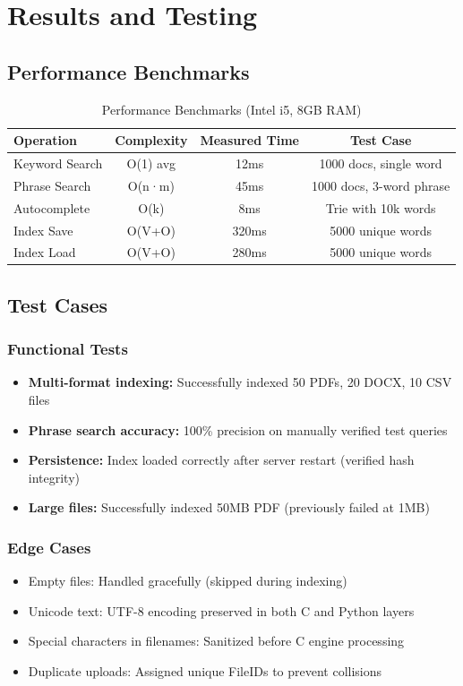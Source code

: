 \documentclass[12pt,a4paper]{article}
\begin{document}
\section{Results and Testing}

\subsection{Performance Benchmarks}

\begin{table}[H]
\centering
\begin{tabular}{|l|c|c|c|}
\hline
\textbf{Operation} & \textbf{Complexity} & \textbf{Measured Time} & \textbf{Test Case} \\
\hline
Keyword Search & O(1) avg & 12ms & 1000 docs, single word \\
Phrase Search & O(n·m) & 45ms & 1000 docs, 3-word phrase \\
Autocomplete & O(k) & 8ms & Trie with 10k words \\
Index Save & O(V+O) & 320ms & 5000 unique words \\
Index Load & O(V+O) & 280ms & 5000 unique words \\
\hline
\end{tabular}
\caption{Performance Benchmarks (Intel i5, 8GB RAM)}
\end{table}

\subsection{Test Cases}

\subsubsection{Functional Tests}
\begin{itemize}
    \item \textbf{Multi-format indexing:} Successfully indexed 50 PDFs, 20 DOCX, 10 CSV files
    \item \textbf{Phrase search accuracy:} 100\% precision on manually verified test queries
    \item \textbf{Persistence:} Index loaded correctly after server restart (verified hash integrity)
    \item \textbf{Large files:} Successfully indexed 50MB PDF (previously failed at 1MB)
\end{itemize}

\subsubsection{Edge Cases}
\begin{itemize}
    \item Empty files: Handled gracefully (skipped during indexing)
    \item Unicode text: UTF-8 encoding preserved in both C and Python layers
    \item Special characters in filenames: Sanitized before C engine processing
    \item Duplicate uploads: Assigned unique FileIDs to prevent collisions
\end{itemize}
\end{document}
